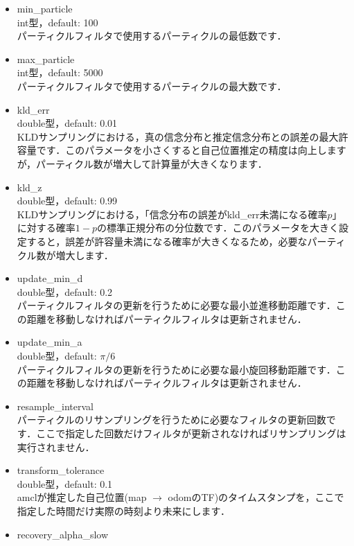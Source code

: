 \documentclass[{../../master}]{subfiles}
\begin{document}
\begin{itemize}
  \item \textsf{min\_particle} \\
    int型，default: 100 \\
    パーティクルフィルタで使用するパーティクルの最低数です．
  \item \textsf{max\_particle} \\
    int型，default: 5000 \\
    パーティクルフィルタで使用するパーティクルの最大数です．
  \item \textsf{kld\_err} \\
    double型，default: 0.01 \\
    KLDサンプリングにおける，真の信念分布と推定信念分布との誤差の最大許容量です．このパラメータを小さくすると自己位置推定の精度は向上しますが，パーティクル数が増大して計算量が大きくなります．
  \item \textsf{kld\_z} \\
    double型，default: 0.99 \\
    KLDサンプリングにおける，「信念分布の誤差が\textsf{kld\_err}未満になる確率$p$」に対する確率$1-p$の標準正規分布の分位数です．このパラメータを大きく設定すると，誤差が許容量未満になる確率が大きくなるため，必要なパーティクル数が増大します．
  \item \textsf{update\_min\_d} \\
    double型，default: 0.2 \\
    パーティクルフィルタの更新を行うために必要な最小並進移動距離です．この距離を移動しなければパーティクルフィルタは更新されません．
  \item \textsf{update\_min\_a} \\
    double型，default: $\pi /6$ \\
    パーティクルフィルタの更新を行うために必要な最小旋回移動距離です．この距離を移動しなければパーティクルフィルタは更新されません．
  \item \textsf{resample\_interval} \\
    パーティクルのリサンプリングを行うために必要なフィルタの更新回数です．ここで指定した回数だけフィルタが更新されなければリサンプリングは実行されません．
  \item \textsf{transform\_tolerance} \\
    double型，default: 0.1 \\
    \textsf{amcl}が推定した自己位置(\textsf{map} $\rightarrow$ \textsf{odom}のTF)のタイムスタンプを，ここで指定した時間だけ実際の時刻より未来にします．
  \item \textsf{recovery\_alpha\_slow} \\

\end{itemize}
\end{document}
